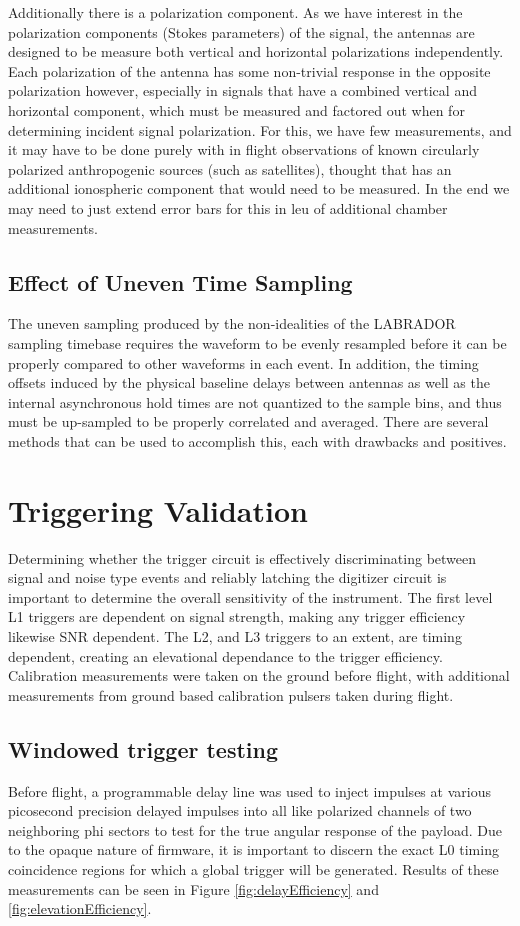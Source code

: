 		Additionally there is a polarization component.  As we have interest in the polarization components (Stokes parameters) of the signal, the antennas are designed to be measure both vertical and horizontal polarizations independently.  Each polarization of the antenna has some non-trivial response in the opposite polarization however, especially in signals that have a combined vertical and horizontal component, which must be measured and factored out when for determining incident signal polarization.  For this, we have few measurements, and it may have to be done purely with in flight observations of known circularly polarized anthropogenic sources (such as satellites), thought that has an additional ionospheric component that would need to be measured.  In the end we may need to just extend error bars for this in leu of additional chamber measurements.
		
	\subsection{Effect of Uneven Time Sampling}
	The uneven sampling produced by the non-idealities of the LABRADOR sampling timebase requires the waveform to be evenly resampled before it can be properly compared to other waveforms in each event.  In addition, the timing offsets induced by the physical baseline delays between antennas as well as the internal asynchronous hold times are not quantized to the sample bins, and thus must be up-sampled to be properly correlated and averaged.  There are several methods that can be used to accomplish this, each with drawbacks and positives.

	
\section{Triggering Validation}
	Determining whether the trigger circuit is effectively discriminating between signal and noise type events and reliably latching the digitizer circuit is important to determine the overall sensitivity of the instrument.  The first level L1 triggers are dependent on signal strength, making any trigger efficiency likewise SNR dependent.  The L2, and L3 triggers to an extent, are timing dependent, creating an elevational dependance to the trigger efficiency.  Calibration measurements were taken on the ground before flight, with additional measurements from ground based calibration pulsers taken during flight.  


	\subsection{Windowed trigger testing}
		Before flight, a programmable delay line was used to inject impulses at various picosecond precision delayed impulses into all like polarized channels of two neighboring phi sectors to test for the true angular response of the payload.  Due to the opaque nature of firmware, it is important to discern the exact L0 timing coincidence regions for which a global trigger will be generated.  Results of these measurements can be seen in Figure \ref{fig:delayEfficiency} and \ref{fig:elevationEfficiency}.

